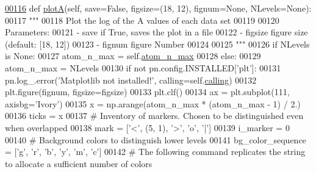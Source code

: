 \begin{DoxyCode}
\hypertarget{classpyneb_1_1plot_1_1plot_atomic_data_1_1_data_plot_l00116}{}\hyperlink{classpyneb_1_1plot_1_1plot_atomic_data_1_1_data_plot_a389e18b521d2052577494c8611cb5c80}{00116}     \textcolor{keyword}{def }\hyperlink{classpyneb_1_1plot_1_1plot_atomic_data_1_1_data_plot_a389e18b521d2052577494c8611cb5c80}{plotA}(self, save=False, figsize=(18, 12), fignum=\textcolor{keywordtype}{None}, NLevels=\textcolor{keywordtype}{None}):
00117         \textcolor{stringliteral}{"""}
00118 \textcolor{stringliteral}{        Plot the log of the A values of each data set }
00119 \textcolor{stringliteral}{        }
00120 \textcolor{stringliteral}{        Parameters:}
00121 \textcolor{stringliteral}{            - save     if True, saves the plot in a file}
00122 \textcolor{stringliteral}{            - figsize  figure size (default: [18, 12])}
00123 \textcolor{stringliteral}{            - fignum    figure Number}
00124 \textcolor{stringliteral}{}
00125 \textcolor{stringliteral}{        """}
00126         \textcolor{keywordflow}{if} NLevels \textcolor{keywordflow}{is} \textcolor{keywordtype}{None}:
00127             atom\_n\_max = self.\hyperlink{classpyneb_1_1plot_1_1plot_atomic_data_1_1_data_plot_a668572cfe9a684e7195535d60d343938}{atom\_n\_max}
00128         \textcolor{keywordflow}{else}:
00129             atom\_n\_max = NLevels
00130         \textcolor{keywordflow}{if} \textcolor{keywordflow}{not} pn.config.INSTALLED[\textcolor{stringliteral}{'plt'}]:
00131             pn.log\_.error(\textcolor{stringliteral}{'Matplotlib not installed!'}, calling=self.\hyperlink{classpyneb_1_1plot_1_1plot_atomic_data_1_1_data_plot_a393a133b607541c57d5ebc5a34687e3f}{calling})
00132         plt.figure(fignum, figsize=figsize)
00133         plt.clf()
00134         ax = plt.subplot(111, axisbg=\textcolor{stringliteral}{'Ivory'})
00135         x = np.arange(atom\_n\_max * (atom\_n\_max - 1) / 2.)
00136         ticks = x
00137         \textcolor{comment}{# Inventory of markers. Chosen to be distinguished even when overlapped}
00138         mark = [\textcolor{stringliteral}{'<'}, (5, 1), \textcolor{stringliteral}{'>'}, \textcolor{stringliteral}{'o'}, \textcolor{stringliteral}{'|'}]
00139         i\_marker = 0
00140         \textcolor{comment}{# Background colors to distinguish lower levels }
00141         bg\_color\_sequence = [\textcolor{stringliteral}{'g'}, \textcolor{stringliteral}{'}\textcolor{stringliteral}{r', '}b', 'y', 'm', 'c']
00142         \textcolor{comment}{# The following command replicates the string to allocate a sufficient number of colors}

\end{DoxyCode}

